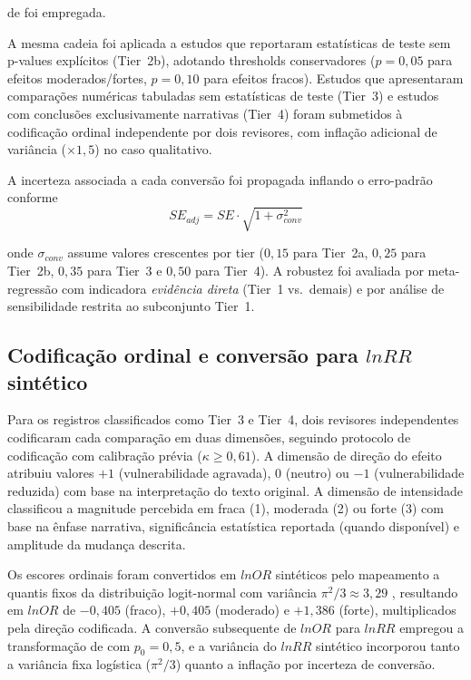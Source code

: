 \documentclass[12pt,a4paper]{article}
\begin{document}
\noindent de \citet{Lajeunesse2011} foi empregada.

A mesma cadeia foi aplicada a estudos que reportaram estatísticas de teste sem p-values explícitos (Tier~2b), adotando thresholds conservadores ($p = 0{,}05$ para efeitos moderados/fortes, $p = 0{,}10$ para efeitos fracos). Estudos que apresentaram comparações numéricas tabuladas sem estatísticas de teste (Tier~3) e estudos com conclusões exclusivamente narrativas (Tier~4) foram submetidos à codificação ordinal independente por dois revisores, com inflação adicional de variância ($\times 1{,}5$) no caso qualitativo.

A incerteza associada a cada conversão foi propagada inflando o erro-padrão conforme
%
\begin{equation}
SE_{adj} = SE \cdot \sqrt{1 + \sigma^2_{conv}}
\label{eq:se-adj}
\end{equation}

\noindent onde $\sigma_{conv}$ assume valores crescentes por tier ($0{,}15$ para Tier~2a, $0{,}25$ para Tier~2b, $0{,}35$ para Tier~3 e $0{,}50$ para Tier~4). A robustez foi avaliada por meta-regressão com indicadora \textit{evidência direta} (Tier~1 vs.~demais) e por análise de sensibilidade restrita ao subconjunto Tier~1.

\subsection{Codificação ordinal e conversão para $lnRR$ sintético}
\label{sec:coding}

Para os registros classificados como Tier~3 e Tier~4, dois revisores independentes codificaram cada comparação em duas dimensões, seguindo protocolo de codificação com calibração prévia ($\kappa \geq 0{,}61$). A dimensão de direção do efeito atribuiu valores $+1$ (vulnerabilidade agravada), $0$ (neutro) ou $-1$ (vulnerabilidade reduzida) com base na interpretação do texto original. A dimensão de intensidade classificou a magnitude percebida em fraca (1), moderada (2) ou forte (3) com base na ênfase narrativa, significância estatística reportada (quando disponível) e amplitude da mudança descrita.

Os escores ordinais foram convertidos em $lnOR$ sintéticos pelo mapeamento a quantis fixos da distribuição logit-normal com variância $\pi^2/3 \approx 3{,}29$ \citep{Hasselblad1995}, resultando em $lnOR$ de $-0{,}405$ (fraco), $+0{,}405$ (moderado) e $+1{,}386$ (forte), multiplicados pela direção codificada. A conversão subsequente de $lnOR$ para $lnRR$ empregou a transformação de \citet{Zhang1998} com $p_0 = 0{,}5$, e a variância do $lnRR$ sintético incorporou tanto a variância fixa logística ($\pi^2/3$) quanto a inflação por incerteza de conversão.
\end{document}

